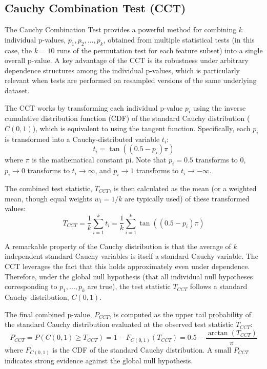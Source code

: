 \begin{appendices}
  \section{Cauchy Combination Test (CCT)}
  \label{sec:cct_methodology}

  The Cauchy Combination Test \autocite{liu2020cauchy} provides a powerful method for combining $k$ individual p-values, $p_1, p_2, ..., p_k$, obtained from multiple statistical tests (in this case, the $k=10$ runs of the permutation test for each feature subset) into a single overall p-value. A key advantage of the CCT is its robustness under arbitrary dependence structures among the individual p-values, which is particularly relevant when tests are performed on resampled versions of the same underlying dataset.

  The CCT works by transforming each individual p-value $p_i$ using the inverse cumulative distribution function (CDF) of the standard Cauchy distribution ($C(0,1)$), which is equivalent to using the tangent function. Specifically, each $p_i$ is transformed into a Cauchy-distributed variable $t_i$:
  \begin{equation}
    t_i = \tan\left( (0.5 - p_i) \pi \right)
    \label{eq:cct_transform}
  \end{equation}
  where $\pi$ is the mathematical constant pi. Note that $p_i=0.5$ transforms to 0, $p_i \to 0$ transforms to $t_i \to \infty$, and $p_i \to 1$ transforms to $t_i \to -\infty$.

  The combined test statistic, $T_{CCT}$, is then calculated as the mean (or a weighted mean, though equal weights $w_i=1/k$ are typically used) of these transformed values:
  \begin{equation}
    T_{CCT} = \frac{1}{k} \sum_{i=1}^k t_i = \frac{1}{k} \sum_{i=1}^k \tan\left( (0.5 - p_i) \pi \right)
    \label{eq:cct_statistic}
  \end{equation}

  A remarkable property of the Cauchy distribution is that the average of $k$ independent standard Cauchy variables is itself a standard Cauchy variable. The CCT leverages the fact that this holds approximately even under dependence. Therefore, under the global null hypothesis (that all individual null hypotheses corresponding to $p_1, ..., p_k$ are true), the test statistic $T_{CCT}$ follows a standard Cauchy distribution, $C(0,1)$.

  The final combined p-value, $P_{CCT}$, is computed as the upper tail probability of the standard Cauchy distribution evaluated at the observed test statistic $T_{CCT}$:
  \begin{equation}
    P_{CCT} = P(C(0,1) \ge T_{CCT}) = 1 - F_{C(0,1)}(T_{CCT}) = 0.5 - \frac{\arctan(T_{CCT})}{\pi}
    \label{eq:cct_pvalue}
  \end{equation}
  where $F_{C(0,1)}$ is the CDF of the standard Cauchy distribution. A small $P_{CCT}$ indicates strong evidence against the global null hypothesis.


\end{appendices}

